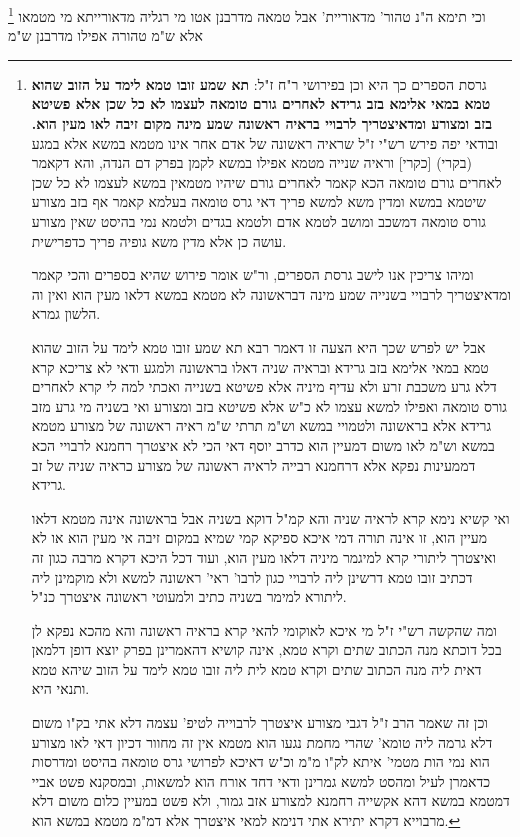 \documentclass[12pt, openany]{book}
\newcommand{\footnotecomment}[1]{
	\renewcommand\thefootnote{}
	\footnote{#1}}
\newcommand{\commenta}[1]{\footnotecomment{#1}}
\begin{document}
{\commenta{גרסת הספרים כך היא וכן בפירושי ר"ח ז"ל: \textbf{תא שמע זובו טמא לימד על הזוב שהוא טמא במאי אלימא בזב גרידא לאחרים גורם טומאה לעצמו לא כל שכן אלא פשיטא בזב ומצורע ומדאיצטריך לרבויי בראיה ראשונה שמע מינה מקום זיבה לאו מעין הוא.} ובודאי יפה פירש רש"י ז"ל שראיה ראשונה של אדם אחר אינו מטמא במשא אלא במגע (בקרי) [כקרי] וראיה שנייה מטמא אפילו במשא לקמן בפרק דם הנדה, והא דקאמר לאחרים גורם טומאה הכא קאמר לאחרים גורם שיהיו מטמאין במשא לעצמו לא כל שכן שיטמא במשא ומדין משא למשא פריך דאי גרס טומאה בעלמא קאמר אף בזב מצורע גורס טומאה דמשכב ומושב לטמא אדם ולטמא בגדים ולטמא נמי בהיסט שאין מצורע עושה כן אלא מדין משא גופיה פריך כדפרישית.\par ומיהו צריכין אנו לישב גרסת הספרים, ור"ש אומר פירוש שהיא בספרים והכי קאמר ומדאיצטריך לרבויי בשנייה שמע מינה דבראשונה לא מטמא במשא דלאו מעין הוא ואין וה הלשון גמרא.\par אבל יש לפרש שכך היא הצעה זו דאמר רבא תא שמע זובו טמא לימד על הזוב שהוא טמא במאי אלימא בזב גרידא ובראיה שניה דאלו בראשונה ולמגע ודאי לא צריכא קרא דלא גרע משכבת זרע ולא עדיף מיניה אלא פשיטא בשנייה ואכתי למה לי קרא לאחרים גורס טומאה ואפילו למשא עצמו לא כ"ש אלא פשיטא בזב ומצורע ואי בשניה מי גרע מזב גרידא אלא בראשונה ולטמויי במשא וש"מ תרתי ש"מ ראיה ראשונה של מצורע מטמא במשא וש"מ לאו משום דמעיין הוא כדרב יוסף דאי הכי לא איצטרך רחמנא לרבויי הכא דממעינות נפקא אלא דרחמנא רבייה לראיה ראשונה של מצורע כראיה שניה של זב גרידא.\par ואי קשיא נימא קרא לראיה שניה והא קמ"ל דוקא בשניה אבל בראשונה אינה מטמא דלאו מעיין הוא, זו אינה תורה דמי איכא ספיקא קמי שמיא במקום זיבה אי מעין הוא או לא ואיצטרך ליתורי קרא למיגמר מיניה דלאו מעין הוא, ועוד דכל היכא דקרא מרבה כגון זה דכתיב זובו טמא דרשינן ליה לרבויי כגון לרבו' ראי' ראשונה למשא ולא מוקמינן ליה ליתורא למימר בשניה כתיב ולמעוטי ראשונה איצטרך כנ"ל.\par ומה שהקשה רש"י ז"ל מי איכא לאוקומי להאי קרא בראיה ראשונה והא מהכא נפקא לן בכל דוכתא מנה הכתוב שתים וקרא טמא, אינה קושיא דהאמרינן בפרק יוצא דופן דלמאן דאית ליה מנה הכתוב שתים וקרא טמא לית ליה זובו טמא לימד על הזוב שיהא טמא ותנאי היא.\par וכן זה שאמר הרב ז"ל דגבי מצורע איצטרך לרבוייה לטיפ' עצמה דלא אתי בק"ו משום דלא גרמה ליה טומא' שהרי מחמת נגעו הוא מטמא אין זה מחוור דכיון דאי לאו מצורע הוא נמי הות מטמי' איתא לק"ו מ"מ וכ"ש דאיכא לפרושי גרס טומאה בהיסט ומדרסות כדאמרן לעיל ומהסט למשא גמרינן ודאי דחד אורח הוא למשאות, ובמסקנא פשט אביי דמטמא במשא דהא אקשייה רחמנא למצורע אזב גמור, ולא פשט במעיין כלום משום דלא מרבוייא דקרא יתירא אתי דנימא למאי איצטרך אלא דמ"מ מטמא במשא הוא. }
וכי תימא ה"נ טהור' מדאוריית' אבל טמאה מדרבנן אטו מי רגליה מדאורייתא מי מטמאו אלא ש"מ טהורה אפילו מדרבנן ש"מ
}
\end{document}
